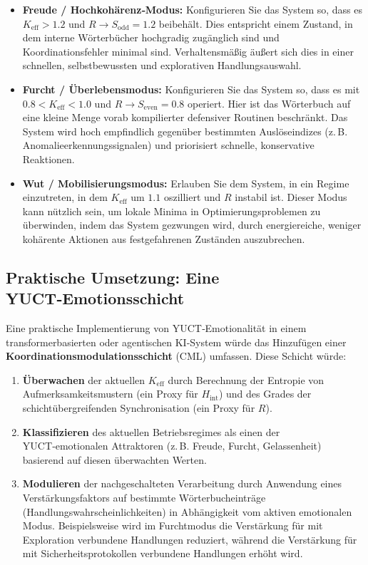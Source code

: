 \documentclass[12pt,a4paper]{article}
\begin{document}
	\begin{itemize}
		\item \textbf{Freude / Hochkohärenz‑Modus:} Konfigurieren Sie das System so, dass es $K_{\mathrm{eff}} > 1.2$ und $R \to S_{\mathrm{odd}} = 1.2$ beibehält. Dies entspricht einem Zustand, in dem interne Wörterbücher hochgradig zugänglich sind und Koordinationsfehler minimal sind. Verhaltensmäßig äußert sich dies in einer schnellen, selbstbewussten und explorativen Handlungsauswahl.
		\item \textbf{Furcht / Überlebensmodus:} Konfigurieren Sie das System so, dass es mit $0.8 < K_{\mathrm{eff}} < 1.0$ und $R \to S_{\mathrm{even}} = 0.8$ operiert. Hier ist das Wörterbuch auf eine kleine Menge vorab kompilierter defensiver Routinen beschränkt. Das System wird hoch empfindlich gegenüber bestimmten Auslöseindizes (z. B. Anomalieerkennungssignalen) und priorisiert schnelle, konservative Reaktionen.
		\item \textbf{Wut / Mobilisierungsmodus:} Erlauben Sie dem System, in ein Regime einzutreten, in dem $K_{\mathrm{eff}}$ um $1.1$ oszilliert und $R$ instabil ist. Dieser Modus kann nützlich sein, um lokale Minima in Optimierungsproblemen zu überwinden, indem das System gezwungen wird, durch energiereiche, weniger kohärente Aktionen aus festgefahrenen Zuständen auszubrechen.
	\end{itemize}
	
	\subsection{Praktische Umsetzung: Eine YUCT‑Emotionsschicht}
	
	Eine praktische Implementierung von YUCT‑Emotionalität in einem transformerbasierten oder agentischen KI‑System würde das Hinzufügen einer \textbf{Koordinationsmodulationsschicht} (CML) umfassen. Diese Schicht würde:
	
	\begin{enumerate}
		\item \textbf{Überwachen} der aktuellen $K_{\mathrm{eff}}$ durch Berechnung der Entropie von Aufmerksamkeitsmustern (ein Proxy für $H_{\mathrm{int}}$) und des Grades der schichtübergreifenden Synchronisation (ein Proxy für $R$).
		\item \textbf{Klassifizieren} des aktuellen Betriebsregimes als einen der YUCT‑emotionalen Attraktoren (z. B. Freude, Furcht, Gelassenheit) basierend auf diesen überwachten Werten.
		\item \textbf{Modulieren} der nachgeschalteten Verarbeitung durch Anwendung eines Verstärkungsfaktors auf bestimmte Wörterbucheinträge (Handlungswahrscheinlichkeiten) in Abhängigkeit vom aktiven emotionalen Modus. Beispielsweise wird im Furchtmodus die Verstärkung für mit Exploration verbundene Handlungen reduziert, während die Verstärkung für mit Sicherheitsprotokollen verbundene Handlungen erhöht wird.
	\end{enumerate}
	
\end{document}
